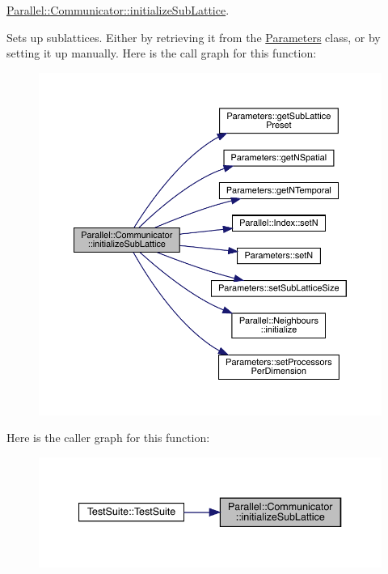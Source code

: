 \mbox{\hyperlink{class_parallel_1_1_communicator_a3094d713d09225738ecf0250019db115}{Parallel\+::\+Communicator\+::initialize\+Sub\+Lattice}}. 

Sets up sublattices. Either by retrieving it from the \mbox{\hyperlink{class_parameters}{Parameters}} class, or by setting it up manually. Here is the call graph for this function\+:
\nopagebreak
\begin{figure}[H]
\begin{center}
\leavevmode
\includegraphics[width=350pt]{class_parallel_1_1_communicator_a3094d713d09225738ecf0250019db115_cgraph}
\end{center}
\end{figure}
Here is the caller graph for this function\+:
\nopagebreak
\begin{figure}[H]
\begin{center}
\leavevmode
\includegraphics[width=340pt]{class_parallel_1_1_communicator_a3094d713d09225738ecf0250019db115_icgraph}
\end{center}
\end{figure}
\mbox{\label{class_parallel_1_1_communicator_a57bb28ee8dbc4efd708a2695423778c4}} 
